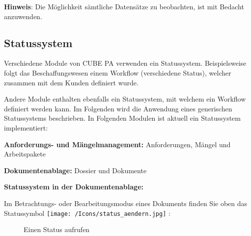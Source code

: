 \vspace{\baselineskip}

\textbf{Hinweis}: Die Möglichkeit sämtliche Datensätze zu beobachten, ist mit Bedacht anzuwenden.

\pagebreak
\subsection{Statussystem} %

Verschiedene Module von CUBE PA verwenden ein Statussystem. Beispielsweise folgt das Beschaffungswesen einem Workflow (verschiedene Status), welcher zusammen mit dem Kunden definiert wurde.

Andere Module enthalten ebenfalls ein Statussystem, mit welchem ein Workflow definiert werden kann. Im Folgenden wird die Anwendung eines generischen Statussystems beschrieben. In Folgenden Modulen ist aktuell ein Statussystem implementiert:

\vspace{\baselineskip}

\begin{compactitem}
	\item \textbf{Anforderungs- und Mängelmanagement:} Anforderungen, Mängel und Arbeitspakete
	\item \textbf{Dokumentenablage:} Dossier und Dokumente
\end{compactitem}

\vspace{\baselineskip}

\textbf{Statussystem in der Dokumentenablage:}

\vspace{\baselineskip}

Im Betrachtungs- oder Bearbeitungsmodus eines Dokuments finden Sie oben das Statussymbol \texttt{[image: /Icons/status\_aendern.jpg]} : 

\begin{figure}[H]
\caption{Einen Status aufrufen}
\end{figure}

